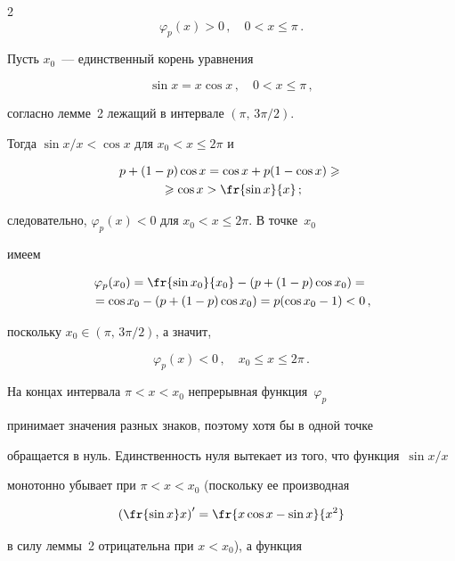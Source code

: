 \begin{multicols}{2}
$$

\varphi_p(x)>0\,,\quad 0<x\le\pi\,.

$$



Пусть $x_0$~--- единственный корень уравнения

$$

\sin x=x\cos x\,,\quad 0<x\le\pi\,,

$$

согласно лемме~2 лежащий в интервале ${(\pi,\, 3\pi/2)}$.

Тогда $\sin x/x<\cos x$ для ${x_0<x\le 2\pi}$ и

\begin{multline*}

p+(1-p)\cos x=\cos x+p(1-\cos x)\ge{}\\

{}\ge \cos x>\fr{\sin x}{x}\,;

\end{multline*}

следовательно, $\varphi_p(x)<0$ для $x_0<x\le2\pi.$ В точке~$x_0$

имеем

\begin{multline*}

\varphi_p(x_0)=\fr{\sin x_0}{x_0}-(p+(1-p)\cos x_0)={}\\

{}=  \cos x_0-(p+(1-p)\cos x_0)=p(\cos x_0-1)<0\,,

\end{multline*}

поскольку $x_0\in(\pi,\,3\pi/2)$, а значит,

$$

\varphi_p(x)<0\,,\quad x_0\le x\le 2\pi\,.

$$



На концах интервала $\pi< x< x_0$ непрерывная функция~$\varphi_p$

принимает значения разных знаков, поэтому хотя бы в одной точке

обращается в нуль. Единственность нуля вытекает из того, что функция~$\sin x/x$

монотонно убывает при $\pi< x< x_0$ (поскольку ее производная

$$

\left(\fr{\sin x}x\right)^\prime=\fr{x\cos x-\sin x}{x^2}

$$

в силу леммы~2 отрицательна при $x<x_0$), а функция


\end{multicols}

